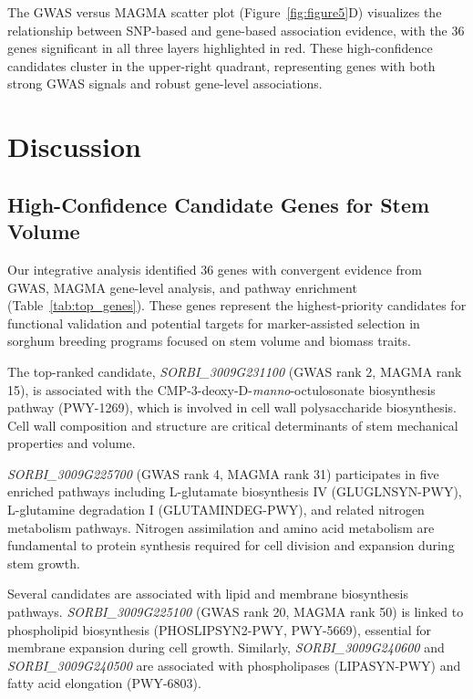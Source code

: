 \documentclass[11pt]{article}
\begin{document}
The GWAS versus MAGMA scatter plot (Figure~\ref{fig:figure5}D) visualizes the relationship between SNP-based and gene-based association evidence, with the 36 genes significant in all three layers highlighted in red. These high-confidence candidates cluster in the upper-right quadrant, representing genes with both strong GWAS signals and robust gene-level associations.

\section{Discussion}

\subsection{High-Confidence Candidate Genes for Stem Volume}

Our integrative analysis identified 36 genes with convergent evidence from GWAS, MAGMA gene-level analysis, and pathway enrichment (Table~\ref{tab:top_genes}). These genes represent the highest-priority candidates for functional validation and potential targets for marker-assisted selection in sorghum breeding programs focused on stem volume and biomass traits.

The top-ranked candidate, \textit{SORBI\_3009G231100} (GWAS rank 2, MAGMA rank 15), is associated with the CMP-3-deoxy-D-\textit{manno}-octulosonate biosynthesis pathway (PWY-1269), which is involved in cell wall polysaccharide biosynthesis. Cell wall composition and structure are critical determinants of stem mechanical properties and volume.

\textit{SORBI\_3009G225700} (GWAS rank 4, MAGMA rank 31) participates in five enriched pathways including L-glutamate biosynthesis IV (GLUGLNSYN-PWY), L-glutamine degradation I (GLUTAMINDEG-PWY), and related nitrogen metabolism pathways. Nitrogen assimilation and amino acid metabolism are fundamental to protein synthesis required for cell division and expansion during stem growth.

Several candidates are associated with lipid and membrane biosynthesis pathways. \textit{SORBI\_3009G225100} (GWAS rank 20, MAGMA rank 50) is linked to phospholipid biosynthesis (PHOSLIPSYN2-PWY, PWY-5669), essential for membrane expansion during cell growth. Similarly, \textit{SORBI\_3009G240600} and \textit{SORBI\_3009G240500} are associated with phospholipases (LIPASYN-PWY) and fatty acid elongation (PWY-6803).
\end{document}
